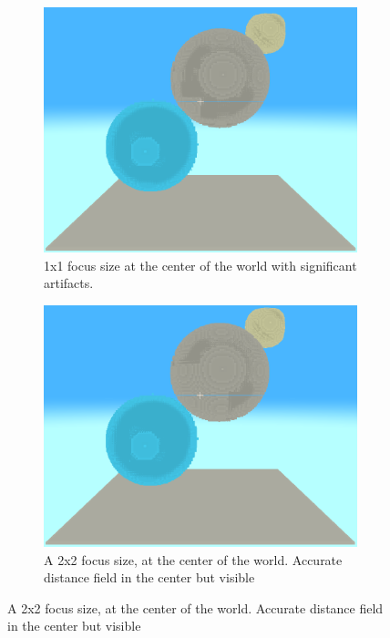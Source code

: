 \begin{figure}[htbp]
    \centering
    \begin{subfigure}[t]{0.32\textwidth}
        \centering
        \includegraphics[width=\textwidth]{figures/hybrid_focus_1.png}
        \caption{1x1 focus size at the center of the world with significant artifacts.}
    \end{subfigure}
    \hfill
    \begin{subfigure}[t]{0.32\textwidth}
        \centering
        \includegraphics[width=\textwidth]{figures/hybrid_focus_2.png}
        \caption{A 2x2 focus size, at the center of the world. Accurate distance field in the center but visible
}
\end{subfigure}
\end{figure}
